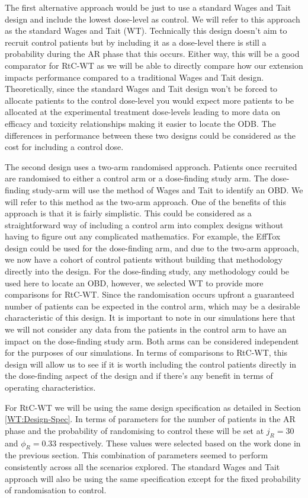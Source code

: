 The first alternative approach would be just to use a standard Wages and Tait design and include the lowest dose-level as control. We will refer to this approach as the standard Wages and Tait (WT). Technically this design doesn't aim to recruit control patients but by including it as a dose-level there is still a probability during the AR phase that this occurs. Either way, this will be a good comparator for RtC-WT as we will be able to directly compare how our extension impacts performance compared to a traditional Wages and Tait design. Theoretically, since the standard Wages and Tait design won't be forced to allocate patients to the control dose-level you would expect more patients to be allocated at the experimental treatment dose-levels leading to more data on efficacy and toxicity relationships making it easier to locate the ODB. The differences in performance between these two designs could be considered as the cost for including a control dose. 

The second design uses a two-arm randomised approach. Patients once recruited are randomised to either a control arm or a dose-finding study arm. The dose-finding study-arm will use the method of Wages and Tait to identify an OBD. We will refer to this method as the two-arm approach. One of the benefits of this approach is that it is fairly simplistic. This could be considered as a straightforward way of including a control arm into complex designs without having to figure out any complicated mathematics. For example, the EffTox design could be used for the dose-finding arm, and due to the two-arm approach, we now have a cohort of control patients without building that methodology directly into the design. For the dose-finding study, any methodology could be used here to locate an OBD, however, we selected WT to provide more comparisons for RtC-WT. Since the randomisation occurs upfront a guaranteed number of patients can be expected in the control arm, which may be a desirable characteristic of this design. It is important to note in our simulations here that we will not consider any data from the patients in the control arm to have an impact on the dose-finding study arm. Both arms can be considered independent for the purposes of our simulations. In terms of comparisons to RtC-WT, this design will allow us to see if it is worth including the control patients directly in the dose-finding aspect of the design and if there's any benefit in terms of operating characteristics.  

For RtC-WT we will be using the same design specification as detailed in Section \ref{WT:Design-Spec}. In terms of parameters for the number of patients in the AR phase and the probability of randomising to control these will be set at $j_R = 30$ and $\phi_R = 0.33 $ respectively. These values were selected based on the work done in the previous section. This combination of parameters seemed to perform consistently across all the scenarios explored. The standard Wages and Tait approach will also be using the same specification except for the fixed probability of randomisation to control.

